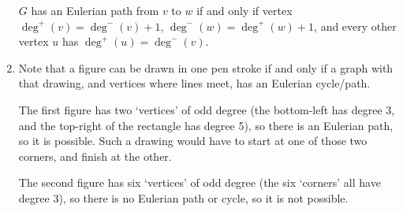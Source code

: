 \documentclass[a4paper,12pt]{article}
\begin{document}
\begin{enumerate}
    $G$ has an Eulerian path from $v$ to $w$ if and
    only if vertex $\deg^+(v) = \deg^-(v) + 1$, $\deg^-(w) = \deg^+(w)+1$,
    and every other vertex $u$ has $\deg^+(u) = \deg^-(v)$.
\item
    Note that a figure can be drawn in one pen stroke if and only if a graph
    with that drawing, and vertices where lines meet, has an Eulerian
    cycle/path.

    The first figure has two `vertices' of odd degree (the bottom-left
    has degree 3, and the top-right of the rectangle has degree 5), so there
    is an Eulerian path, so it is possible. Such a drawing would have to start
    at one of those two corners, and finish at the other.

    The second figure has six `vertices' of odd degree (the six `corners' all
    have degree 3), so there is no Eulerian path or cycle, so it is not
    possible.
\end{enumerate}
\end{document}
